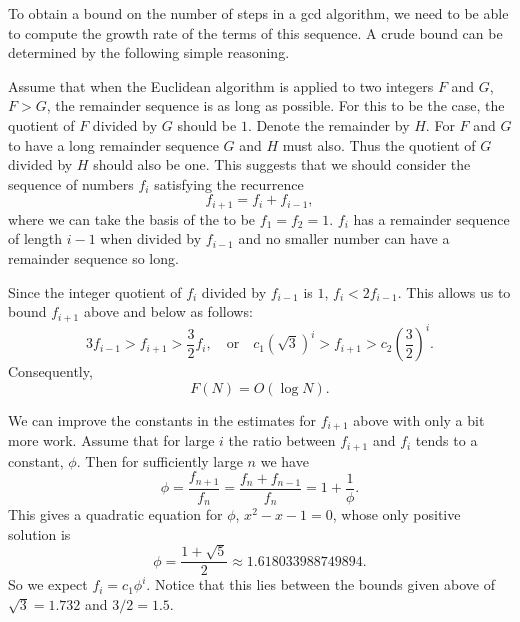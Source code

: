 To obtain a bound on the number of steps in a {\sc gcd} algorithm, we need
to be able to compute the growth rate of the terms of this sequence.
A crude bound can be determined by the following simple reasoning.

Assume that when the Euclidean algorithm is applied to two integers
$F$ and $G$, $F > G$, the remainder sequence is as long as possible.
For this to be the case, the quotient of $F$ divided by $G$ should be
$1$.  Denote the remainder by $H$.  For $F$ and $G$ to have a long
remainder sequence $G$ and $H$ must also.  Thus the quotient of $G$
divided by $H$ should also be one.  This suggests that we should
consider the sequence of numbers $f_i$ satisfying the 
recurrence
\begin{equation}
\label{Fibonacci:Eq}
f_{i+1} = f_i + f_{i-1},
\end{equation}
where we can take the basis of the  to be $f_{1} =
f_{2} = 1$.  $f_i$ has a remainder sequence of length $i-1$ when
divided by $f_{i-1}$ and no smaller number can have a remainder
sequence so long.\label{Fibonacci:Remainder:Sequence}

Since the integer quotient of $f_{i}$ divided by $f_{i-1}$ is $1$,
$f_{i} < 2 f_{i-1}$.  This allows us to bound $f_{i+1}$ above and
below as follows:
\[
3 f_{i-1} > f_{i+1} > \frac{3}{2} f_{i},
\quad\mbox{or}\quad
c_1\left(\sqrt{3}\right)^i > f_{i+1} > c_2 (\frac{3}{2})^{i}.
\]
Consequently,
\[
F(N) = O(\log N).
\]

We can improve the constants in the estimates for $f_{i+1}$ above with
only a bit more work.  Assume that for large $i$ the ratio between
$f_{i+1}$ and $f_i$ tends to a constant, $\phi$.  Then for sufficiently
large $n$ we have 
\[
\phi = \frac{f_{n+1}}{f_n} = \frac{f_n + f_{n-1}}{f_n} = 1 + \frac{1}{\phi}.
\]
This gives a quadratic equation for $\phi$, $x^2 - x - 1=0$, whose
only positive solution is
\[
\phi = \frac{1 + \sqrt{5}}{2} \approx 1.618033988749894.
\]
So we expect $f_i = c_1 \phi^i$.  
Notice that this lies between the bounds given above of $\sqrt{3} =
1.732$ and $3/2 = 1.5$.  


